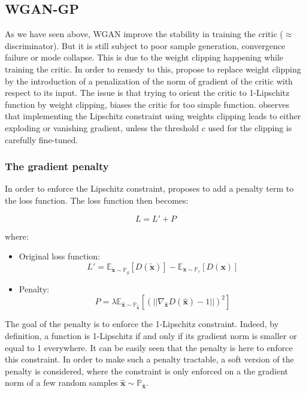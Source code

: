 \documentclass[11pt,a4paper,twoside]{report}
\begin{document}
\subsection{WGAN-GP}

As we have seen above, WGAN improve the stability in training the critic ($\approx$ discriminator). But it is still subject to poor sample generation, convergence failure or mode collapse. This is due to the weight clipping happening while training the critic. In order to remedy to this, \cite{DBLP:journals/corr/GulrajaniAADC17} propose to replace weight clipping by the introduction of a penalization of the norm of gradient of the critic with respect to its input. The issue is that trying to orient the critic to 1-Lipschitz function by weight clipping, biases the critic for too simple function. \cite{DBLP:journals/corr/GulrajaniAADC17} observes that implementing the Lipschitz constraint using weights clipping leads to either exploding or vanishing gradient, unless the threshold $c$ used for the clipping is carefully fine-tuned.

\subsubsection{The gradient penalty}

In order to enforce the Lipschitz constraint, \cite{DBLP:journals/corr/GulrajaniAADC17} proposes to add a penalty term to the loss function. The loss function then becomes: 

\begin{equation}
    L = L' + P
\end{equation}

where:

\begin{itemize}
    \item Original loss function: 
    \begin{equation}
        L' = \mathbb{E}_{\mathbf{\tilde{x}} \sim \mathbb{P}_g} [D(\mathbf{\tilde{x}})] - \mathbb{E}_{\mathbf{x} \sim \mathbb{P}_r} [D(\mathbf{x})]
    \end{equation}
    \item Penalty:
    \begin{equation}
        P = \lambda \mathbb{E}_{\hat{\mathbf{x}} \sim \mathbb{P}_{\hat{\mathbf{x}}}}[(||\nabla_{\hat{\mathbf{x}}} D(\hat{\mathbf{x}})-1||)^2]
    \end{equation}
\end{itemize}

The goal of the penalty is to enforce the 1-Lipschitz constraint. Indeed, by definition, a function is 1-Lipschitz if and only if its gradient norm is smaller or equal to 1 everywhere. It can be easily seen that the penalty is here to enforce this constraint. In order to make such a penalty tractable, a soft version of the penalty is considered, where the constraint is only enforced on a the gradient norm of a few random samples $\hat{\mathbf{x}} \sim \mathbb{P}_{\hat{\mathbf{x}}}$.
\end{document}
